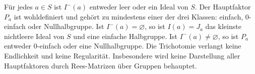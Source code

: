 \begin{theorem}
\label{b28guide:thm:principal-factors}
Für jedes $a\in S$ ist $I^-(a)$ entweder leer oder ein Ideal von $S$.
Der Hauptfaktor $P_a$ ist wohldefiniert und gehört zu mindestens
einer der drei Klassen: einfach, $0$-einfach oder Nullhalbgruppe.
Ist $I^-(a)=\varnothing$, so ist $I(a)=J_a$ das kleinste nichtleere
Ideal von $S$ und eine einfache Halbgruppe.
Ist $I^-(a)\ne\varnothing$, so ist $P_a$ entweder $0$-einfach oder
eine Nullhalbgruppe.
Die Trichotomie verlangt keine Endlichkeit und keine Regularität.
Insbesondere wird keine Darstellung aller Hauptfaktoren durch
Rees-Matrizen über Gruppen behauptet.
\cite{howie,bajri}
\end{theorem}
